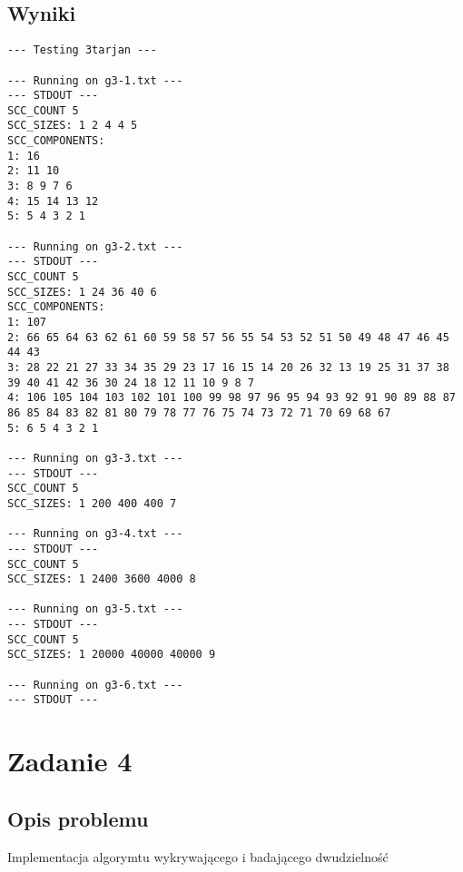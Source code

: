 \documentclass{article}
\begin{document}
\subsection{Wyniki}
\begin{verbatim}
--- Testing 3tarjan ---

--- Running on g3-1.txt ---
--- STDOUT ---
SCC_COUNT 5
SCC_SIZES: 1 2 4 4 5
SCC_COMPONENTS:
1: 16
2: 11 10
3: 8 9 7 6
4: 15 14 13 12
5: 5 4 3 2 1

--- Running on g3-2.txt ---
--- STDOUT ---
SCC_COUNT 5
SCC_SIZES: 1 24 36 40 6
SCC_COMPONENTS:
1: 107
2: 66 65 64 63 62 61 60 59 58 57 56 55 54 53 52 51 50 49 48 47 46 45 44 43
3: 28 22 21 27 33 34 35 29 23 17 16 15 14 20 26 32 13 19 25 31 37 38 39 40 41 42 36 30 24 18 12 11 10 9 8 7
4: 106 105 104 103 102 101 100 99 98 97 96 95 94 93 92 91 90 89 88 87 86 85 84 83 82 81 80 79 78 77 76 75 74 73 72 71 70 69 68 67
5: 6 5 4 3 2 1

--- Running on g3-3.txt ---
--- STDOUT ---
SCC_COUNT 5
SCC_SIZES: 1 200 400 400 7

--- Running on g3-4.txt ---
--- STDOUT ---
SCC_COUNT 5
SCC_SIZES: 1 2400 3600 4000 8

--- Running on g3-5.txt ---
--- STDOUT ---
SCC_COUNT 5
SCC_SIZES: 1 20000 40000 40000 9

--- Running on g3-6.txt ---
--- STDOUT ---
\end{verbatim}
\vspace{4cm}

\section{Zadanie 4}
\subsection{Opis problemu}
Implementacja algorymtu wykrywającego i badającego dwudzielność
\end{document}
